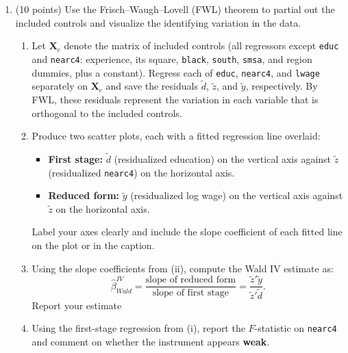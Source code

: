 \documentclass[letterpaper,12pt]{article}
\begin{document}
\begin{enumerate}[label=(\alph*)]

\item (10 points) Use the Frisch--Waugh--Lovell (FWL) theorem to partial out the included controls and visualize the identifying variation in the data.

\begin{enumerate}[label=(\roman*)]
    \item Let $\bm{X}_c$ denote the matrix of included controls (all regressors except \texttt{educ} and \texttt{nearc4}: experience, its square, \texttt{black}, \texttt{south}, \texttt{smsa}, and region dummies, plus a constant). Regress each of \texttt{educ}, \texttt{nearc4}, and \texttt{lwage} separately on $\bm{X}_c$ and save the residuals $\tilde{d}$, $\tilde{z}$, and $\tilde{y}$, respectively. By FWL, these residuals represent the variation in each variable that is orthogonal to the included controls.

    \item Produce two scatter plots, each with a fitted regression line overlaid:
    \begin{itemize}
        \item \textbf{First stage:} $\tilde{d}$ (residualized education) on the vertical axis against $\tilde{z}$ (residualized \texttt{nearc4}) on the horizontal axis.
        \item \textbf{Reduced form:} $\tilde{y}$ (residualized log wage) on the vertical axis against $\tilde{z}$ on the horizontal axis.
    \end{itemize}
    Label your axes clearly and include the slope coefficient of each fitted line on the plot or in the caption.

    \item Using the slope coefficients from (ii), compute the Wald IV estimate as:
    \begin{equation}
        \hat{\beta}^{IV}_{Wald} = \frac{\text{slope of reduced form}}{\text{slope of first stage}} = \frac{\tilde{z}'\tilde{y}}{\tilde{z}'\tilde{d}}.
        \label{eq:wald}
    \end{equation}
    Report your estimate 

    \item Using the first-stage regression from (i), report the $F$-statistic on \texttt{nearc4} and comment on whether the instrument appears \textbf{weak}. 
\end{enumerate}


\end{enumerate}
\end{document}
